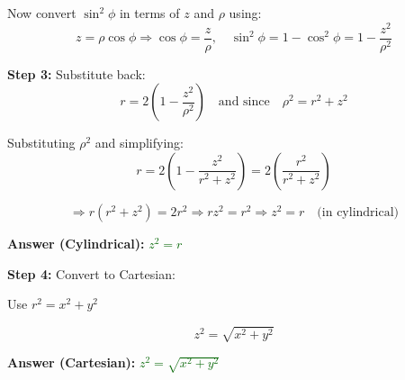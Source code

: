 \documentclass[10pt]{article}                               %
\begin{document}
\begin{adjustwidth}{2em}{0pt}
\begin{adjustwidth}{2em}{0pt}
\begin{examplebox}
\begin{adjustwidth}{2em}{0pt}
                    Now convert \( \sin^2\phi \) in terms of \( z \) and \( \rho \) using:
                    \[
                    z = \rho \cos\phi \Rightarrow \cos\phi = \frac{z}{\rho}, \quad \sin^2\phi = 1 - \cos^2\phi = 1 - \frac{z^2}{\rho^2}
                    \]
                
                    \vspace{0.5em}
                
                    \textbf{Step 3:} Substitute back:
                    \[
                    r = 2\left(1 - \frac{z^2}{\rho^2} \right)
                    \quad \text{and since} \quad \rho^2 = r^2 + z^2
                    \]

                    \break
                
                    Substituting \( \rho^2 \) and simplifying:
                    \[
                    r = 2\left(1 - \frac{z^2}{r^2 + z^2} \right)
                    = 2\left( \frac{r^2}{r^2 + z^2} \right)
                    \]
                
                    \[
                    \Rightarrow r(r^2 + z^2) = 2r^2
                    \Rightarrow r z^2 = r^2
                    \Rightarrow z^2 = r \quad \text{(in cylindrical)}
                    \]
                
                    \vspace{0.5em}
                
                    \textbf{Answer (Cylindrical):} \textcolor{darkgreen}{\( z^2 = r \)}
                
                    \vspace{0.5em}
                
                    \textbf{Step 4:} Convert to Cartesian:
                
                    Use \( r^2 = x^2 + y^2 \)
                
                    \[
                    z^2 = \sqrt{x^2 + y^2}
                    \]
                
                    \vspace{0.5em}
                
                    \textbf{Answer (Cartesian):} \textcolor{darkgreen}{\( z^2 = \sqrt{x^2 + y^2} \)}
                
                \end{adjustwidth}
            
            \end{examplebox}

    \end{adjustwidth}

\end{adjustwidth}
\end{document}
